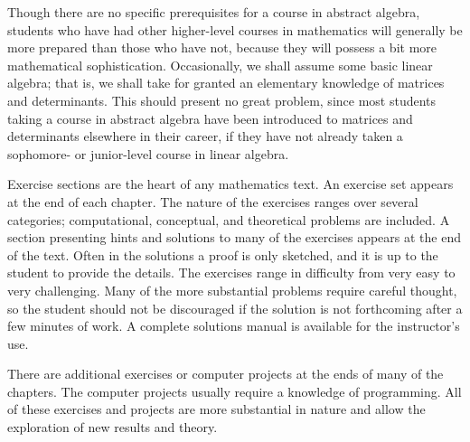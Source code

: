 \begin{figure}[htb]
\begin{center}

\end{center}
\end{figure}

 
 
Though there are no specific prerequisites for a course in abstract
algebra, students who have had other higher-level courses in
mathematics will generally be more prepared than those who have not,
because they will possess a bit more mathematical sophistication.
Occasionally, we shall assume some basic linear algebra; that is, we
shall take for granted an elementary knowledge of matrices and
determinants. This should present no great problem, since most
students taking a course in abstract algebra have been introduced to
matrices and determinants elsewhere in their career, if they have not
already taken a sophomore- or junior-level course in linear algebra.   
 
 

 
Exercise sections are the heart of any mathematics text. An exercise
set appears at the end of each chapter. The nature of the exercises
ranges over several categories; computational,  conceptual, and
theoretical problems are included. A section presenting hints and
solutions to many of the exercises appears at the end of the text.
Often in the solutions a proof is only sketched, and it is up to the
student to provide the details. The exercises range in difficulty from
very easy to very challenging. Many of the more substantial problems
require careful thought, so the student should not be discouraged if
the solution is not forthcoming after a few minutes of work. A
complete solutions manual is available for the instructor's use. 


There are additional exercises or computer projects at the ends of
many of the chapters. The computer projects usually require a
knowledge of programming. All of these exercises and projects are more
substantial in nature and allow the exploration of new results and
theory.
 

